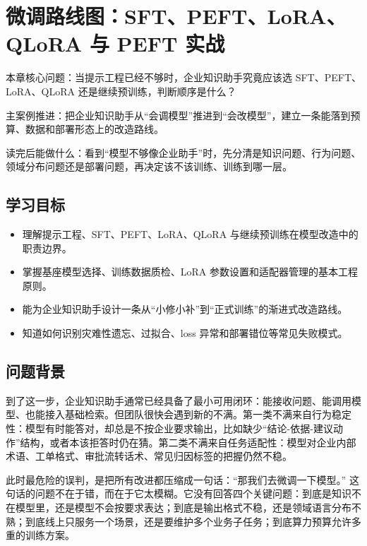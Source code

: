 \chapter{微调路线图：SFT、PEFT、LoRA、QLoRA 与 PEFT 实战}

\begin{introduction}
\item {\heiti 本章核心问题}：当提示工程已经不够时，企业知识助手究竟应该选 SFT、PEFT、LoRA、QLoRA 还是继续预训练，判断顺序是什么？
\item {\heiti 主案例推进}：把企业知识助手从“会调模型”推进到“会改模型”，建立一条能落到预算、数据和部署形态上的改造路线。
\item {\heiti 读完后能做什么}：看到“模型不够像企业助手”时，先分清是知识问题、行为问题、领域分布问题还是部署问题，再决定该不该训练、训练到哪一层。
\end{introduction}

\section{学习目标}
\begin{itemize}
  \item 理解提示工程、SFT、PEFT、LoRA、QLoRA 与继续预训练在模型改造中的职责边界。
  \item 掌握基座模型选择、训练数据质检、LoRA 参数设置和适配器管理的基本工程原则。
  \item 能为企业知识助手设计一条从“小修小补”到“正式训练”的渐进式改造路线。
  \item 知道如何识别灾难性遗忘、过拟合、loss 异常和部署错位等常见失败模式。
\end{itemize}

\section{问题背景}
到了这一步，企业知识助手通常已经具备了最小可用闭环：能接收问题、能调用模型、也能接入基础检索。但团队很快会遇到新的不满。第一类不满来自{\heiti 行为稳定性}：模型有时能答对，却总是不按企业要求输出，比如缺少“结论-依据-建议动作”结构，或者本该拒答时仍在猜。第二类不满来自{\heiti 任务适配性}：模型对企业内部术语、工单格式、审批流转话术、常见归因标签的把握仍然不稳。

此时最危险的误判，是把所有改进都压缩成一句话：{\heiti “那我们去微调一下模型。”} 这句话的问题不在于错，而在于它太模糊。它没有回答四个关键问题：到底是知识不在模型里，还是模型不会按要求表达；到底是输出格式不稳，还是领域语言分布不熟；到底线上只服务一个场景，还是要维护多个业务子任务；到底算力预算允许多重的训练方案。

